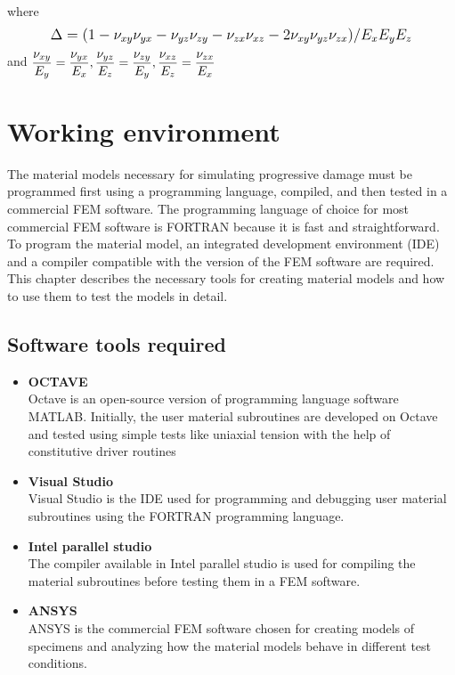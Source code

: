 \documentclass[12pt]{report}
\begin{document}
 where 
 \begin{align*}
\mathlarger{ \Delta = (1 - \nu_{xy}\nu_{yx} - \nu_{yz}\nu_{zy} - \nu_{zx}\nu_{xz} - 2\nu_{xy}\nu_{yz}\nu_{zx})/E_{x}E_{y}E_{z}}
 \end{align*}
   and  $\mathlarger{\frac{\nu_{xy}}{E_{y}} = \frac{\nu_{yx}}{E_{x}}, \frac{\nu_{yz}}{E_{z}} = \frac{\nu_{zy}}{E_{y}}, \frac{\nu_{xz}}{E_{z}} = \frac{\nu_{zx}}{E_{x}} }$ 


\newpage
\vspace*{3cm}
\chapter{Working environment}
\vspace*{1cm}
\indent\indent\indent  The material models necessary for simulating progressive damage must be programmed first using a programming language, compiled, and then tested in a commercial FEM software. The programming language of choice for most commercial FEM software is FORTRAN because it is fast and straightforward. To program the material model, an integrated development environment (IDE) and a compiler compatible with the version of the FEM software are required. This chapter describes the necessary tools for creating material models and how to use them to test the models in detail.   
\vspace*{1cm}
\section{Software tools required}
\begin{itemize}
\item \textbf{OCTAVE}\\ \indent
\hspace*{13mm} Octave is an open-source version of programming language software MATLAB. Initially, the user material subroutines are developed on Octave and tested using simple tests like uniaxial tension with the help of constitutive driver routines
\item \textbf{Visual Studio }\\
\hspace*{13mm} Visual Studio is the IDE used for programming and debugging user material subroutines using the FORTRAN programming language.
\item \textbf{Intel parallel studio}\\
\hspace*{13mm} The compiler available in Intel parallel studio is used for compiling the material subroutines before testing them in a FEM software.
\item \textbf{ANSYS }\\
\hspace*{13mm}ANSYS is the commercial FEM software chosen for creating models of specimens and analyzing how the material models behave in different test conditions.
\end{itemize}
\end{document}

